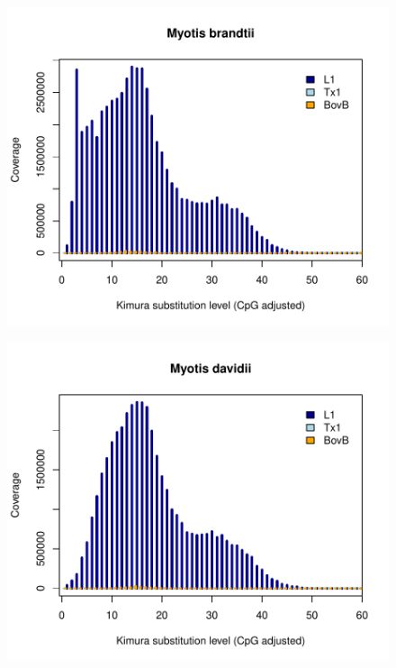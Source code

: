 \documentclass[12pt,a4paper,times]{article}
\begin{document}
\begin{figure}[H]
	\centering
	\includegraphics[scale=0.8]{suppFigures/divergencePlots/Myotis_brandtii.pdf}
	\caption{\label{Myotis_brandtii}}
\end{figure}

\begin{figure}[H]
	\centering
	\includegraphics[scale=0.8]{suppFigures/divergencePlots/Myotis_davidii.pdf}
	\caption{\label{Myotis_davidii}}
\end{figure}
\end{document}
